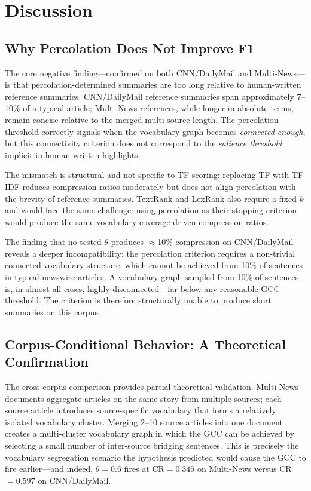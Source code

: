 \documentclass[11pt,letterpaper]{article}
\begin{document}
\section{Discussion}
\label{sec:discussion}

\subsection{Why Percolation Does Not Improve F1}

The core negative finding---confirmed on both CNN/DailyMail and Multi-News---is that
percolation-determined summaries are too long relative to human-written reference
summaries. CNN/DailyMail reference summaries span approximately 7--10\% of a typical
article; Multi-News references, while longer in absolute terms, remain concise relative
to the merged multi-source length. The percolation threshold correctly signals when the
vocabulary graph becomes \emph{connected enough}, but this connectivity criterion does
not correspond to the \emph{salience threshold} implicit in human-written highlights.

The mismatch is structural and not specific to TF scoring: replacing TF with TF-IDF
reduces compression ratios moderately but does not align percolation with the brevity of
reference summaries. TextRank and LexRank \citep{Mihalcea2004,Erkan2004} also require a
fixed $k$ and would face the same challenge: using percolation as their stopping
criterion would produce the same vocabulary-coverage-driven compression ratios.

The finding that no tested $\theta$ produces $\approx$10\% compression on CNN/DailyMail
reveals a deeper incompatibility: the percolation criterion requires a non-trivial
connected vocabulary structure, which cannot be achieved from 10\% of sentences in
typical newswire articles. A vocabulary graph sampled from 10\% of sentences is, in
almost all cases, highly disconnected---far below any reasonable GCC threshold. The
criterion is therefore structurally unable to produce short summaries on this corpus.

\subsection{Corpus-Conditional Behavior: A Theoretical Confirmation}

The cross-corpus comparison provides partial theoretical validation. Multi-News documents
aggregate articles on the same story from multiple sources; each source article introduces
source-specific vocabulary that forms a relatively isolated vocabulary cluster. Merging
2--10 source articles into one document creates a multi-cluster vocabulary graph in which
the GCC can be achieved by selecting a small number of inter-source bridging sentences.
This is precisely the vocabulary segregation scenario the hypothesis predicted would cause
the GCC to fire earlier---and indeed, $\theta{=}0.6$ fires at CR$=0.345$ on Multi-News
versus CR$=0.597$ on CNN/DailyMail.
\end{document}
